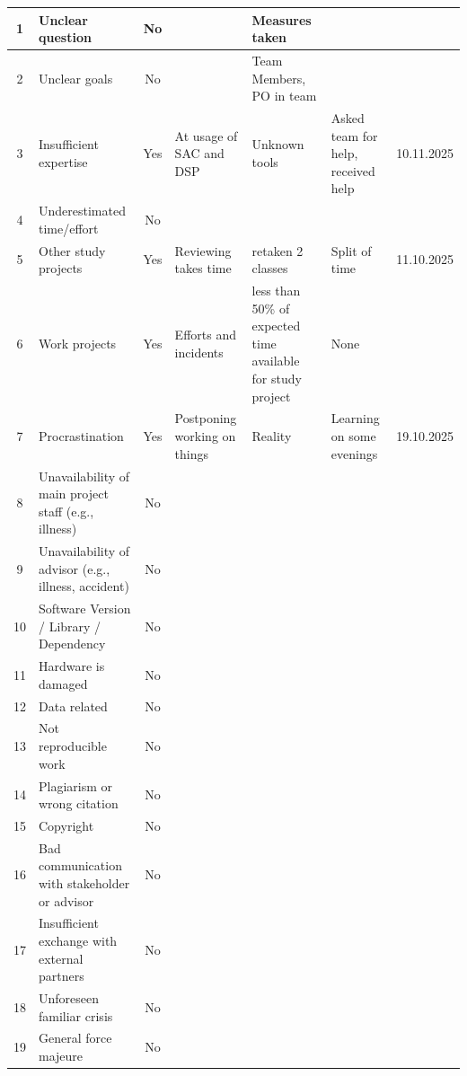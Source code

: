 \begin{landscape}
\begin{longtable}{|c|p{4cm}|c|p{3cm}|p{3cm}|p{3cm}|c|}
1  & Unclear question & No  &  & Measures taken &  &  \\ \hline
2  & Unclear goals & No  &  & Team Members, PO in team &  &  \\ \hline
3  & Insufficient expertise & Yes & At usage of SAC and DSP & Unknown tools & Asked team for help, received help & 10.11.2025 \\ \hline
4  & Underestimated time/effort & No  &  &  &  &  \\ \hline
5  & Other study projects & Yes & Reviewing takes time & retaken 2 classes & Split of time & 11.10.2025 \\ \hline
6  & Work projects & Yes & Efforts and incidents & less than 50\% of expected time available for study project & None &  \\ \hline
7  & Procrastination & Yes & Postponing working on things & Reality & Learning on some evenings & 19.10.2025 \\ \hline
8  & Unavailability of main project staff (e.g., illness) & No &  &  &  &  \\ \hline
9  & Unavailability of advisor (e.g., illness, accident) & No &  &  &  &  \\ \hline
10 & Software Version / Library / Dependency & No &  &  &  &  \\ \hline
11 & Hardware is damaged & No &  &  &  &  \\ \hline
12 & Data related & No &  &  &  &  \\ \hline
13 & Not reproducible work & No &  &  &  &  \\ \hline
14 & Plagiarism or wrong citation & No &  &  &  &  \\ \hline
15 & Copyright & No &  &  &  &  \\ \hline
16 & Bad communication with stakeholder or advisor & No &  &  &  &  \\ \hline
17 & Insufficient exchange with external partners & No &  &  &  &  \\ \hline
18 & Unforeseen familiar crisis & No &  &  &  &  \\ \hline
19 & General force majeure & No &  &  &  &  \\ \hline

\end{longtable}
\end{landscape}

